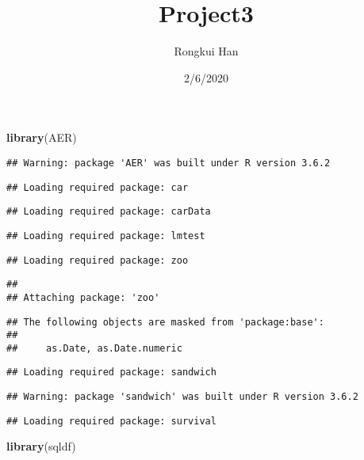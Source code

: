 \documentclass[]{article}
\title{Project3}
\author{Rongkui Han}
\date{2/6/2020}
\newenvironment{Shaded}{\begin{snugshade}}{\end{snugshade}}
\newcommand{\KeywordTok}[1]{\textcolor[rgb]{0.13,0.29,0.53}{\textbf{#1}}}
\newcommand{\NormalTok}[1]{#1}
\begin{document}
\maketitle

{
\setcounter{tocdepth}{2}
\tableofcontents
}
\begin{Shaded}
\begin{Highlighting}[]
\KeywordTok{library}\NormalTok{(AER)}
\end{Highlighting}
\end{Shaded}

\begin{verbatim}
## Warning: package 'AER' was built under R version 3.6.2
\end{verbatim}

\begin{verbatim}
## Loading required package: car
\end{verbatim}

\begin{verbatim}
## Loading required package: carData
\end{verbatim}

\begin{verbatim}
## Loading required package: lmtest
\end{verbatim}

\begin{verbatim}
## Loading required package: zoo
\end{verbatim}

\begin{verbatim}
## 
## Attaching package: 'zoo'
\end{verbatim}

\begin{verbatim}
## The following objects are masked from 'package:base':
## 
##     as.Date, as.Date.numeric
\end{verbatim}

\begin{verbatim}
## Loading required package: sandwich
\end{verbatim}

\begin{verbatim}
## Warning: package 'sandwich' was built under R version 3.6.2
\end{verbatim}

\begin{verbatim}
## Loading required package: survival
\end{verbatim}

\begin{Shaded}
\begin{Highlighting}[]
\KeywordTok{library}\NormalTok{(sqldf)}
\end{Highlighting}
\end{Shaded}
\end{document}
